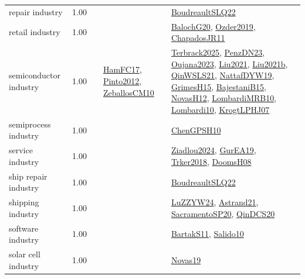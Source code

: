 {\begin{longtable}{p{3cm}r>{\raggedright\arraybackslash}p{6cm}>{\raggedright\arraybackslash}p{6cm}>{\raggedright\arraybackslash}p{8cm}}
\index{repair industry}\index{Industries!repair industry}repair industry &  1.00 &  &  & \hyperref[detail:BoudreaultSLQ22]{BoudreaultSLQ22}\\
\index{retail industry}\index{Industries!retail industry}retail industry &  1.00 &  &  & \hyperref[detail:BalochG20]{BalochG20}, \hyperref[detail:Ozder2019]{Ozder2019}, \hyperref[detail:ChapadosJR11]{ChapadosJR11}\\
\index{semiconductor industry}\index{Industries!semiconductor industry}semiconductor industry &  1.00 &  & \hyperref[detail:HamFC17]{HamFC17}, \hyperref[detail:Pinto2012]{Pinto2012}, \hyperref[detail:ZeballosCM10]{ZeballosCM10} & \hyperref[detail:Terbrack2025]{Terbrack2025}, \hyperref[detail:PenzDN23]{PenzDN23}, \hyperref[detail:Oujana2023]{Oujana2023}, \hyperref[detail:Liu2021]{Liu2021}, \hyperref[detail:Liu2021b]{Liu2021b}, \hyperref[detail:QinWSLS21]{QinWSLS21}, \hyperref[detail:NattafDYW19]{NattafDYW19}, \hyperref[detail:GrimesH15]{GrimesH15}, \hyperref[detail:BajestaniB15]{BajestaniB15}, \hyperref[detail:NovasH12]{NovasH12}, \hyperref[detail:LombardiMRB10]{LombardiMRB10}, \hyperref[detail:Lombardi10]{Lombardi10}, \hyperref[detail:KrogtLPHJ07]{KrogtLPHJ07}\\
\index{semiprocess industry}\index{Industries!semiprocess industry}semiprocess industry &  1.00 &  &  & \hyperref[detail:ChenGPSH10]{ChenGPSH10}\\
\index{service industry}\index{Industries!service industry}service industry &  1.00 &  &  & \hyperref[detail:Ziadlou2024]{Ziadlou2024}, \hyperref[detail:GurEA19]{GurEA19}, \hyperref[detail:Trker2018]{Trker2018}, \hyperref[detail:DoomsH08]{DoomsH08}\\
\index{ship repair industry}\index{Industries!ship repair industry}ship repair industry &  1.00 &  &  & \hyperref[detail:BoudreaultSLQ22]{BoudreaultSLQ22}\\
\index{shipping industry}\index{Industries!shipping industry}shipping industry &  1.00 &  &  & \hyperref[detail:LuZZYW24]{LuZZYW24}, \hyperref[detail:Astrand21]{Astrand21}, \hyperref[detail:SacramentoSP20]{SacramentoSP20}, \hyperref[detail:QinDCS20]{QinDCS20}\\
\index{software industry}\index{Industries!software industry}software industry &  1.00 &  &  & \hyperref[detail:BartakS11]{BartakS11}, \hyperref[detail:Salido10]{Salido10}\\
\index{solar cell industry}\index{Industries!solar cell industry}solar cell industry &  1.00 &  &  & \hyperref[detail:Novas19]{Novas19}\\

\end{longtable}}
